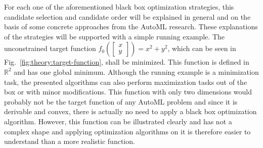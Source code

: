 For each one of the aforementioned black box optimization strategies, this candidate selection and candidate order will be explained in general and on the basis of some concrete approaches from the AutoML research.
These explanations of the strategies will be supported with a simple running example.\newline
The unconstrained target function $f_0 \left( \begin{bmatrix}x\\y \end{bmatrix} \right) = x^2 + y^2$, which can be seen in Fig.~\ref{fig:theory:target-function}, shall be minimized.
This function is defined in $\mathbb{R}^2$ and has one global minimum.
Although the running example is a minimization task, the presented algorithms can also perform maximization tasks out of the box or with minor modifications.\newline
This function with only two dimensions would probably not be the target function of any AutoML problem and since it is derivable and convex, there is actually no need to apply a black box optimization algorithm.
However, this function can be illustrated clearly and has not a complex shape and applying optimization algorithms on it is therefore easier to understand than a more realistic function.
